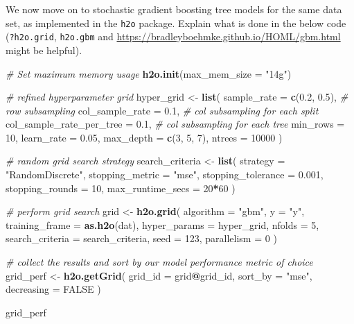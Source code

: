 \documentclass[
]{article}
\newenvironment{Shaded}{\begin{snugshade}}{\end{snugshade}}
\newcommand{\AttributeTok}[1]{\textcolor[rgb]{0.13,0.29,0.53}{#1}}
\newcommand{\CommentTok}[1]{\textcolor[rgb]{0.56,0.35,0.01}{\textit{#1}}}
\newcommand{\ConstantTok}[1]{\textcolor[rgb]{0.56,0.35,0.01}{#1}}
\newcommand{\DecValTok}[1]{\textcolor[rgb]{0.00,0.00,0.81}{#1}}
\newcommand{\FloatTok}[1]{\textcolor[rgb]{0.00,0.00,0.81}{#1}}
\newcommand{\FunctionTok}[1]{\textcolor[rgb]{0.13,0.29,0.53}{\textbf{#1}}}
\newcommand{\NormalTok}[1]{#1}
\newcommand{\OtherTok}[1]{\textcolor[rgb]{0.56,0.35,0.01}{#1}}
\newcommand{\SpecialCharTok}[1]{\textcolor[rgb]{0.81,0.36,0.00}{\textbf{#1}}}
\newcommand{\StringTok}[1]{\textcolor[rgb]{0.31,0.60,0.02}{#1}}
\begin{document}
We now move on to stochastic gradient boosting tree models for the same
data set, as implemented in the \texttt{h2o} package. Explain what is
done in the below code (\texttt{?h2o.grid}, \texttt{h2o.gbm} and
\url{https://bradleyboehmke.github.io/HOML/gbm.html} might be helpful).

\begin{Shaded}
\begin{Highlighting}[]
\CommentTok{\# Set maximum memory usage}
\FunctionTok{h2o.init}\NormalTok{(}\AttributeTok{max\_mem\_size =} \StringTok{"14g"}\NormalTok{)}

\CommentTok{\# refined hyperparameter grid}
\NormalTok{hyper\_grid }\OtherTok{\textless{}{-}} \FunctionTok{list}\NormalTok{(}
  \AttributeTok{sample\_rate =} \FunctionTok{c}\NormalTok{(}\FloatTok{0.2}\NormalTok{, }\FloatTok{0.5}\NormalTok{),              }\CommentTok{\# row subsampling}
  \AttributeTok{col\_sample\_rate =} \FloatTok{0.1}\NormalTok{,          }\CommentTok{\# col subsampling for each split}
  \AttributeTok{col\_sample\_rate\_per\_tree =} \FloatTok{0.1}\NormalTok{,  }\CommentTok{\# col subsampling for each tree}
  \AttributeTok{min\_rows =} \DecValTok{10}\NormalTok{,}
  \AttributeTok{learn\_rate =} \FloatTok{0.05}\NormalTok{,}
  \AttributeTok{max\_depth =} \FunctionTok{c}\NormalTok{(}\DecValTok{3}\NormalTok{, }\DecValTok{5}\NormalTok{, }\DecValTok{7}\NormalTok{),}
  \AttributeTok{ntrees =} \DecValTok{10000}
\NormalTok{)}

\CommentTok{\# random grid search strategy}
\NormalTok{search\_criteria }\OtherTok{\textless{}{-}} \FunctionTok{list}\NormalTok{(}
  \AttributeTok{strategy =} \StringTok{"RandomDiscrete"}\NormalTok{,}
  \AttributeTok{stopping\_metric =} \StringTok{"mse"}\NormalTok{,}
  \AttributeTok{stopping\_tolerance =} \FloatTok{0.001}\NormalTok{,}
  \AttributeTok{stopping\_rounds =} \DecValTok{10}\NormalTok{,}
  \AttributeTok{max\_runtime\_secs =} \DecValTok{20}\SpecialCharTok{*}\DecValTok{60}
\NormalTok{)}

\CommentTok{\# perform grid search }
\NormalTok{grid }\OtherTok{\textless{}{-}} \FunctionTok{h2o.grid}\NormalTok{(}
  \AttributeTok{algorithm =} \StringTok{"gbm"}\NormalTok{,}
  \AttributeTok{y =} \StringTok{"y"}\NormalTok{,}
  \AttributeTok{training\_frame =} \FunctionTok{as.h2o}\NormalTok{(dat),}
  \AttributeTok{hyper\_params =}\NormalTok{ hyper\_grid,}
  \AttributeTok{nfolds =} \DecValTok{5}\NormalTok{,}
  \AttributeTok{search\_criteria =}\NormalTok{ search\_criteria,}
  \AttributeTok{seed =} \DecValTok{123}\NormalTok{,}
  \AttributeTok{parallelism =} \DecValTok{0}
\NormalTok{)}

\CommentTok{\# collect the results and sort by our model performance metric of choice}
\NormalTok{grid\_perf }\OtherTok{\textless{}{-}} \FunctionTok{h2o.getGrid}\NormalTok{(}
  \AttributeTok{grid\_id =}\NormalTok{ grid}\SpecialCharTok{@}\NormalTok{grid\_id,}
  \AttributeTok{sort\_by =} \StringTok{"mse"}\NormalTok{,}
  \AttributeTok{decreasing =} \ConstantTok{FALSE}
\NormalTok{)}

\NormalTok{grid\_perf}
\end{Highlighting}
\end{Shaded}
\end{document}
